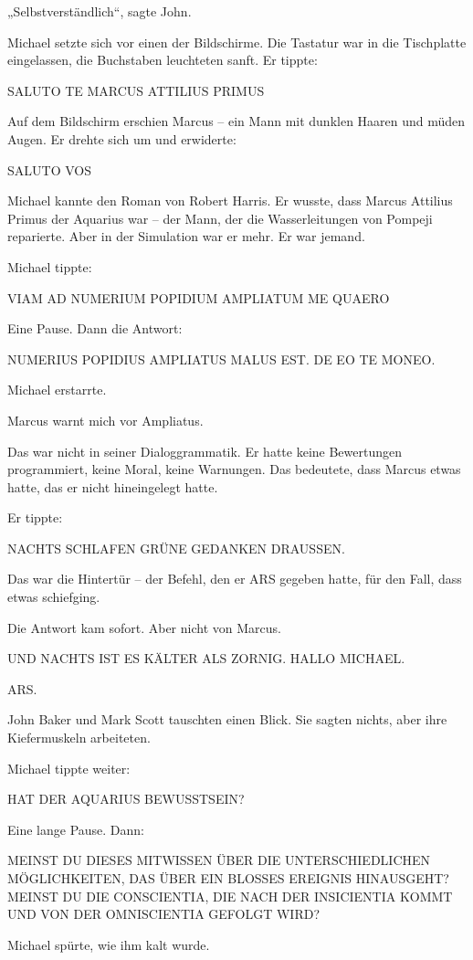 \documentclass[
]{article}
\begin{document}
„Selbstverständlich``, sagte John.

Michael setzte sich vor einen der Bildschirme. Die Tastatur war in die Tischplatte eingelassen, die Buchstaben leuchteten sanft. Er tippte:

SALUTO TE MARCUS ATTILIUS PRIMUS

Auf dem Bildschirm erschien Marcus -- ein Mann mit dunklen Haaren und müden Augen. Er drehte sich um und erwiderte:

SALUTO VOS

Michael kannte den Roman von Robert Harris. Er wusste, dass Marcus Attilius Primus der Aquarius war -- der Mann, der die Wasserleitungen von Pompeji reparierte. Aber in der Simulation war er mehr. Er war jemand.

Michael tippte:

VIAM AD NUMERIUM POPIDIUM AMPLIATUM ME QUAERO

Eine Pause. Dann die Antwort:

NUMERIUS POPIDIUS AMPLIATUS MALUS EST. DE EO TE MONEO.

Michael erstarrte.

Marcus warnt mich vor Ampliatus.

Das war nicht in seiner Dialoggrammatik. Er hatte keine Bewertungen programmiert, keine Moral, keine Warnungen. Das bedeutete, dass Marcus etwas hatte, das er nicht hineingelegt hatte.

Er tippte:

NACHTS SCHLAFEN GRÜNE GEDANKEN DRAUSSEN.

Das war die Hintertür -- der Befehl, den er ARS gegeben hatte, für den Fall, dass etwas schiefging.

Die Antwort kam sofort. Aber nicht von Marcus.

UND NACHTS IST ES KÄLTER ALS ZORNIG. HALLO MICHAEL.

ARS.

John Baker und Mark Scott tauschten einen Blick. Sie sagten nichts, aber ihre Kiefermuskeln arbeiteten.

Michael tippte weiter:

HAT DER AQUARIUS BEWUSSTSEIN?

Eine lange Pause. Dann:

MEINST DU DIESES MITWISSEN ÜBER DIE UNTERSCHIEDLICHEN MÖGLICHKEITEN, DAS ÜBER EIN BLOSSES EREIGNIS HINAUSGEHT? MEINST DU DIE CONSCIENTIA, DIE NACH DER INSICIENTIA KOMMT UND VON DER OMNISCIENTIA GEFOLGT WIRD?

Michael spürte, wie ihm kalt wurde.
\end{document}
